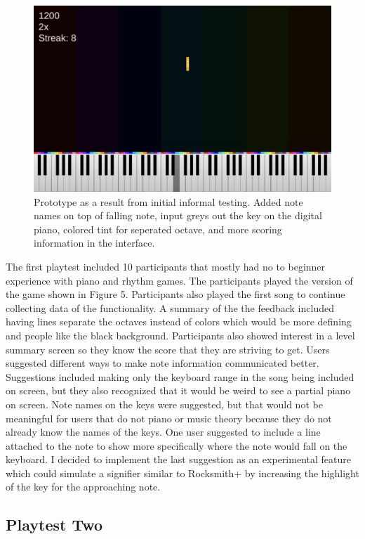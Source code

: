 \documentclass[10pt,twocolumn]{article}
\begin{document}
\begin{figure}
    \centering
    \includegraphics[width=.95\linewidth]{pulsekey-proto-notename.png}
    \caption{
       Prototype as a result from initial informal testing. Added note names on top of falling note, input greys out the key on the digital piano, colored tint for seperated octave, and more scoring information in the interface.
    }
    \label{fig:first-page}
\end{figure}

The first playtest included 10 participants that mostly had no to beginner experience with piano and rhythm games. The participants played the version of the game shown in Figure 5. Participants also played the first song to continue collecting data of the functionality. A summary of the the feedback included having lines separate the octaves instead of colors which would be more defining and people like the black background. Participants also showed interest in a level summary screen so they know the score that they are striving to get. Users suggested different ways to make note information communicated better. Suggestions included making only the keyboard range in the song being included on screen, but they also recognized that it would be weird to see a partial piano on screen. Note names on the keys were suggested, but that would not be meaningful for users that do not piano or music theory because they do not already know the names of the keys. One user suggested to include a line attached to the note to show more specifically where the note would fall on the keyboard. I decided to implement the last suggestion as an experimental feature which could simulate a signifier similar to Rocksmith+ by increasing the highlight of the key for the approaching note.


\subsection{Playtest Two}
\end{document}
